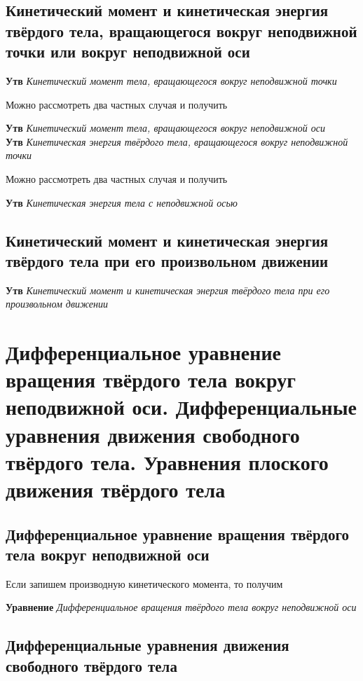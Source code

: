\documentclass[a4paper, 14pt]{article}
\begin{document}
    \subsection{Кинетический момент и кинетическая энергия твёрдого тела, вращающегося вокруг неподвижной точки или
    вокруг неподвижной оси}
    
    \textbf{Утв} \textit{Кинетический момент тела, вращающегося вокруг неподвижной точки}
    
    Можно рассмотреть два частных случая и получить
    
    \textbf{Утв} \textit{Кинетический момент тела, вращающегося вокруг неподвижной оси} \\
    
    \textbf{Утв} \textit{Кинетическая энергия твёрдого тела, вращающегося вокруг неподвижной точки}
    
    Можно рассмотреть два частных случая и получить
    
    \textbf{Утв} \textit{Кинетическая энергия тела с неподвижной осью}
    
    \subsection{Кинетический момент и кинетическая энергия твёрдого тела при его произвольном движении}
    
    \textbf{Утв} \textit{Кинетический момент и кинетическая энергия твёрдого тела при его произвольном движении}
    
    \section{Дифференциальное уравнение вращения твёрдого тела вокруг неподвижной оси.
    Дифференциальные уравнения движения свободного твёрдого тела.
    Уравнения плоского движения твёрдого тела}
    
    \subsection{Дифференциальное уравнение вращения твёрдого тела вокруг неподвижной оси}
    
    Если запишем производную кинетического момента, то получим
    
    \textbf{Уравнение} \textit{Дифференциальное вращения твёрдого тела вокруг неподвижной оси}
    
    \subsection{Дифференциальные уравнения движения свободного твёрдого тела}
    
\end{document}
